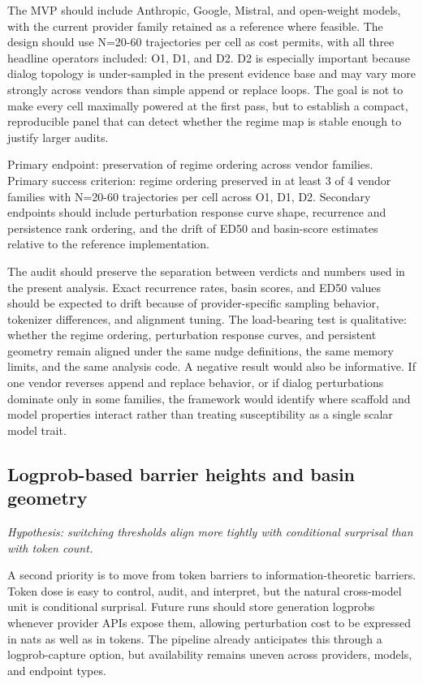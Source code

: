 \documentclass{article}
\theoremstyle{plain}
\theoremstyle{definition}
\begin{document}
The MVP should include Anthropic, Google, Mistral, and open-weight models, with the current provider family retained as a reference where feasible. The design should use N=20-60 trajectories per cell as cost permits, with all three headline operators included: O1, D1, and D2. D2 is especially important because dialog topology is under-sampled in the present evidence base and may vary more strongly across vendors than simple append or replace loops. The goal is not to make every cell maximally powered at the first pass, but to establish a compact, reproducible panel that can detect whether the regime map is stable enough to justify larger audits.

Primary endpoint: preservation of regime ordering across vendor families. Primary success criterion: regime ordering preserved in at least 3 of 4 vendor families with N=20-60 trajectories per cell across O1, D1, D2. Secondary endpoints should include perturbation response curve shape, recurrence and persistence rank ordering, and the drift of ED50 and basin-score estimates relative to the reference implementation.

The audit should preserve the separation between verdicts and numbers used in the present analysis. Exact recurrence rates, basin scores, and ED50 values should be expected to drift because of provider-specific sampling behavior, tokenizer differences, and alignment tuning. The load-bearing test is qualitative: whether the regime ordering, perturbation response curves, and persistent geometry remain aligned under the same nudge definitions, the same memory limits, and the same analysis code. A negative result would also be informative. If one vendor reverses append and replace behavior, or if dialog perturbations dominate only in some families, the framework would identify where scaffold and model properties interact rather than treating susceptibility as a single scalar model trait.

\subsection{Logprob-based barrier heights and basin geometry}

\textit{Hypothesis: switching thresholds align more tightly with conditional surprisal than with token count.}

A second priority is to move from token barriers to information-theoretic barriers. Token dose is easy to control, audit, and interpret, but the natural cross-model unit is conditional surprisal. Future runs should store generation logprobs whenever provider APIs expose them, allowing perturbation cost to be expressed in nats as well as in tokens. The pipeline already anticipates this through a logprob-capture option, but availability remains uneven across providers, models, and endpoint types.
\end{document}
